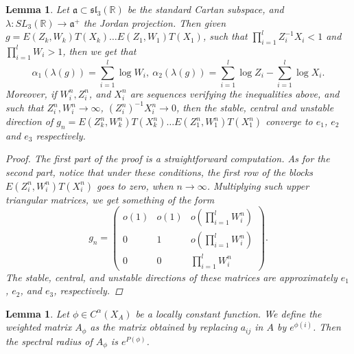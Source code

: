 \documentclass[10pt,a4paper]{amsart}
\newtheorem{lemma}{Lemma}
\newtheorem{lem}{Lemma}
\begin{document}
\begin{lemma}
\label{lemma:eigenvalues}
 Let $\mathfrak{a} \subset \mathfrak{sl}_3 (\mathbb{R})$ be the standard Cartan subspace, and $\lambda : SL_3 (\mathbb{R}) \rightarrow \mathfrak{a}^+$ the Jordan projection.
 Then given $g = E(Z_k,W_k) T(X_k) \ldots E(Z_1,W_1) T(X_1)$, such that $\prod_{i=1}^l Z_i^{-1} X_i < 1$ and $\prod_{i=1}^l W_i > 1$, then we get that
 $$\alpha_1 (\lambda (g)) = \sum_{i=1}^l \log W_i, \: \alpha_2 (\lambda (g)) = \sum_{i=1}^l \log Z_i - \sum_{i=1}^l \log X_i .$$
 Moreover, if $W_i^n,Z_i^n$, and $X_i^n$ are sequences verifying the inequalities above, and such that $Z_i^n, W_i^n \to \infty$, $(Z_i^n)^{-1} X_i^n \to 0$, then the stable, central and unstable direction of $g_n = E(Z_k^n,W_k^n) T(X_k^n) \ldots E(Z_1^n,W_1^n) T(X_1^n)$ converge to $e_1$, $e_2$ and $e_3$ respectively. 
\begin{proof}
 The first part of the proof is a straightforward computation.
 As for the second part, notice that under these conditions, the first row of the blocks $E(Z_i^n, W_i^n) T(X_i^n)$ goes to zero, when $n \to \infty$.
 Multiplying such upper triangular matrices, we get something of the form
   $$g_n = 
   \begin{pmatrix}
 o(1) & o(1) & o(\prod_{i=1}^l W_i^n) \\
   0 & 1 & o(\prod_{i=1}^l W_i^n)\\
   0 & 0 & \prod_{i=1}^l W_i^n
   \end{pmatrix}.$$
 The stable, central, and unstable directions of these matrices are approximately $e_1$, $e_2$, and $e_3$, respectively.
\end{proof}
\end{lemma}

\begin{lem}
\label{lemma:locallyconstant}
Let $\phi \in C^{\alpha}(X_A)$ be a locally constant function. We define the \emph{weighted matrix} $A_\phi$ as the matrix obtained by replacing $a_{ij}$ in $A$ by $e^{\phi(i)}$. Then the spectral radius of $A_\phi$ is $e^{P(\phi)}$.
\end{lem}
\end{document}
